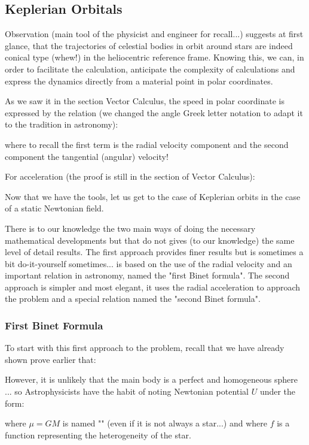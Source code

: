 	\pagebreak
	\subsection{Keplerian Orbitals}\label{keplerian orbitals}
	Observation (main tool of the physicist and engineer for recall...) suggests at first glance, that the trajectories of celestial bodies in orbit around stars are indeed conical type (whew!) in the heliocentric reference frame. Knowing this, we can, in order to facilitate the calculation, anticipate the complexity of calculations and express the dynamics directly from a material point in polar coordinates.

	As we saw it in the section Vector Calculus, the speed in polar coordinate is expressed by the relation (we changed the angle Greek letter notation to adapt it to the tradition in astronomy):
	
	where to recall the first term is the radial velocity component and the second component the tangential (angular) velocity!

	For acceleration (the proof is still in the section of Vector Calculus):
	
	Now that we have the tools, let us get to the case of Keplerian orbits in the case of a static Newtonian field.

	There is to our knowledge the two main ways of doing the necessary mathematical developments but that do not gives (to our knowledge) the same level of detail results. The first approach provides finer results but is sometimes a bit do-it-yourself sometimes... is based on the use of the radial velocity and an important relation in astronomy, named the "first Binet formula". The second approach is simpler and most elegant, it uses the radial acceleration to approach the problem and a special relation named the "second Binet formula".
	
	\subsubsection{First Binet Formula}
	To start with this first approach to the problem, recall that we have already shown prove earlier that:
	
	However, it is unlikely that the main body is a perfect and homogeneous sphere ... so Astrophysicists have the habit of noting Newtonian potential $U$ under the form:
	
	where $\mu=GM$ is named "" (even if it is not always a star...) and where $f$ is a function representing the heterogeneity of the star.
	
